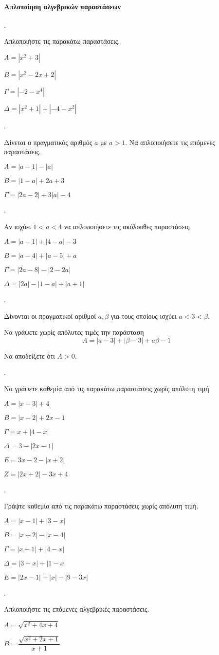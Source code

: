 \documentclass[11pt,a4paper,twocolumn]{article}
\newcounter{askhsh}
\newcommand{\askhsh}{{\large\theaskhsh.}\ \addtocounter{askhsh}{1}}
\begin{document}
\paragraph{Απλοποίηση αλγεβρικών παραστάσεων}
\askhsh Απλοποιήστε τις παρακάτω παραστάσεις.
\begin{alist}
\item $A=\left|x^2+3\right|$
\item $B=\left|x^2-2x+2\right|$
\item $\varGamma=\left|-2-x^4\right|$
\item $\varDelta=\left|x^2+1\right|+\left|-4-x^2\right|$
\end{alist}
\askhsh Δίνεται ο πραγματικός αριθμός $a$ με $a>1$. Να απλοποιήσετε τις επόμενες παραστάσεις.
\begin{alist}
\item $A=|a-1|-|a|$
\item $B=|1-a|+2a+3$
\item $\varGamma=|2a-2|+3|a|-4$
\end{alist}
\askhsh Αν ισχύει $1<a<4$ να απλοποιήσετε τις ακόλουθες παραστάσεις.
\begin{alist}
\item $A=|a-1|+|4-a|-3$
\item $B=|a-4|+|a-5|+a$
\item $\varGamma=|2a-8|-|2-2a|$
\item $\varDelta=|2a|-|1-a|+|a+1|$
\end{alist}
\askhsh Δίνονται οι πραγματικοί αριθμοί $a,\beta$ για τους οποίους ισχύει $a<3<\beta$.
\begin{alist}
\item Να γράψετε χωρίς απόλυτες τιμές την παράσταση
\[ A=|a-3|+|\beta-3|+a\beta-1 \]
\item Να αποδείξετε ότι $A>0$.
\end{alist}
\askhsh Να γράψετε καθεμία από τις παρακάτω παραστάσεις χωρίς απόλυτη τιμή.
\begin{alist}
\item $A=|x-3|+4$
\item $B=|x-2|+2x-1$
\item $\varGamma=x+|4-x|$
\item $\varDelta=3-|2x-1|$
\item $E=3x-2-|x+2|$
\item $Z=|2x+2|-3x+4$
\end{alist}
\askhsh Γράψτε καθεμία από τις παρακάτω παραστάσεις χωρίς απόλυτη τιμή.
\begin{alist}
\item $Α=|x-1|+|3-x|$
\item $B=|x+2|-|x-4|$
\item $\varGamma=|x+1|+|4-x|$
\item $\varDelta=|3-x|+|1-x|$
\item $E=|2x-1|+|x|-|9-3x|$
\end{alist}
\askhsh Απλοποιήστε τις επόμενες αλγεβρικές παραστάσεις.
\begin{alist}
\item $A=\sqrt{x^2+4x+4}$
\item $B=\dfrac{\sqrt{x^2+2x+1}}{x+1}$
\item 
\end{alist}
\end{document}
